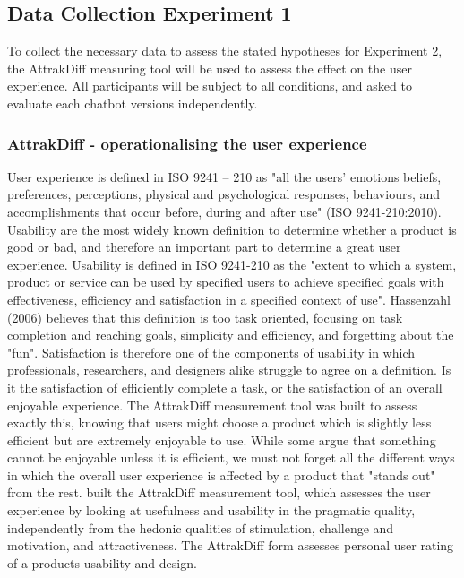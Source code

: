     \vspace{5mm} %
    
\subsection{Data Collection Experiment 1}
To collect the necessary data to assess the stated hypotheses for Experiment 2, the AttrakDiff measuring tool will be used to assess the effect on the user experience. All participants will be subject to all conditions, and asked to evaluate each chatbot versions independently.

    \vspace{5mm} %
   
    \subsubsection{AttrakDiff - operationalising the user experience}
    
    User experience is defined in ISO 9241 – 210 as "all the users' emotions beliefs, preferences, perceptions, physical and psychological responses, behaviours, and accomplishments that occur before, during and after use" (ISO 9241-210:2010). Usability are the most widely known definition to determine whether a product is good or bad, and therefore an important part to determine a great user experience. Usability is defined in ISO 9241-210 as the "extent to which a system, product or service can be used by specified users to achieve specified goals with effectiveness, efficiency and satisfaction in a specified context of use". Hassenzahl (2006) believes that this definition is too task oriented, focusing on task completion and reaching goals, simplicity and efficiency, and forgetting about the "fun". Satisfaction is therefore one of the components of usability in which professionals, researchers, and designers alike struggle to agree on a definition. Is it the satisfaction of efficiently complete a task, or the satisfaction of an overall enjoyable experience. The AttrakDiff measurement tool was built to assess exactly this, knowing that users might choose a product which is slightly less efficient but are extremely enjoyable to use. While some argue that something cannot be enjoyable unless it is efficient, we must not forget all the different ways in which the overall user experience is affected by a product that "stands out" from the rest. \cite{Hassenzahl2000} built the AttrakDiff measurement tool, which assesses the user experience by looking at usefulness and usability in the pragmatic quality, independently from the hedonic qualities of stimulation, challenge and motivation, and attractiveness. The AttrakDiff form assesses personal user rating of a products usability and design.
    
